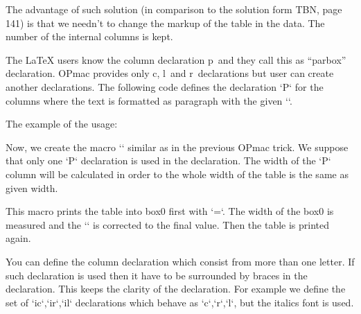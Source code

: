 The advantage of such solution (in comparison to the solution form TBN, page 141) is that we needn't to change the markup of the table in the data. The number of the internal columns is kept. 


 


The LaTeX users know the column declaration p~and they call this as “parbox” declaration. OPmac provides only c, l~and r~declarations but user can create another declarations. The following code defines the declaration `P` for the columns where the text is formatted as paragraph with the given `\Pwidth`. 

\begtt
\newdimen\Pwidth 
\def\tabdeclareP {\tabiteml\vtop{\hsize=\Pwidth \rightskip=0pt plus1fil 
   \baselineskip=1.2em \lineskiplimit=0pt \noindent ##\tabstrutA}\hss\tabitemr} 
\endtt


The example of the usage: 

\begtt
\Pwidth=3cm  
\endtt


Now, we create the macro `` similar as in the previous OPmac trick. We suppose that only one `P` declaration is used in the declaration. The width of the `P` column will be calculated in order to the whole width of the table is the same as given width. 

\begtt
\newdimen\tabw 
\def\tableto#1#2#3{{\Pwidth=.5\hsize \setbox0=\table{#2}{#3} 
   \tabw=#1\relax \advance\tabw by-\wd0 \advance\Pwidth by\tabw \table{#2}{#3}}} 
\endtt


This macro prints the table into box0 first with `\Pwidth=\hsize`. The width of the box0 is measured and the `\Pwidth` is corrected to the final value. Then the table is printed again. 


 


You can define the column declaration which consist from more than one letter. If such declaration is used then it have to be surrounded by {\tt{}}braces{\tt{}} in the declaration. This keeps the clarity of the declaration. For example we define the set of `ic`,`ir`,`il` declarations which behave as `c`,`r`,`l`, but the italics font is used. 

\begtt
\def\tabdeclareic{\tabiteml\it\hfil##\unsskip\hfil\tabitemr} 
\def\tabdeclareil{\tabiteml\it##\unsskip\hfil\tabitemr} 
\def\tabdeclareir{\tabiteml\it\hfil##\unsskip\tabitemr} 
\endtt



